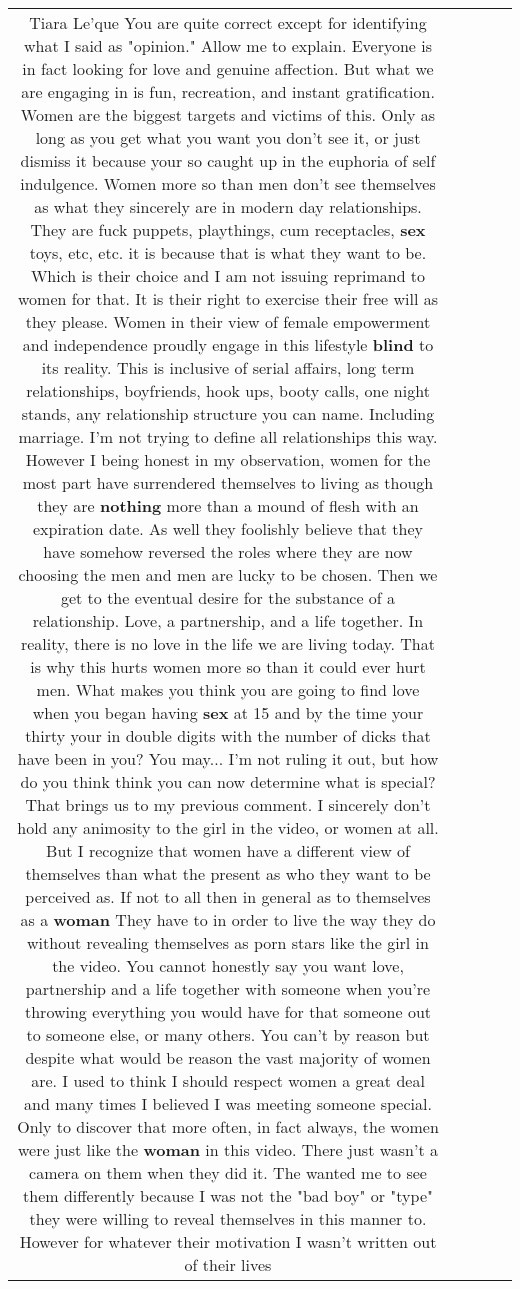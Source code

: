 \documentclass[11pt]{article}
\newlength\mylength
\begin{document}
\begin{center}
\begin{longtable}{|C{.65\mylength}|C{.30\mylength}|C{.12\mylength}|C{.12\mylength}|C{.12\mylength}|}
  \small Tiara Le'que  You are quite correct except for identifying  what I said as "opinion." Allow me to explain. Everyone is in fact looking for love and genuine affection.  But what we are engaging in is fun, recreation, and instant gratification. Women are the biggest targets and victims of this. Only as long as you get what you want you don't see it, or just dismiss it because your so caught up in the euphoria of self indulgence. Women more so than men don't see themselves as what they sincerely are in modern day relationships. They are fuck puppets, playthings, cum receptacles, \textbf{sex} toys, etc, etc. it is because that is what they want to be. Which is their choice and I am not issuing reprimand to women for that. It is their right to exercise their free will as they please.  Women in their view of female empowerment and independence proudly engage in this lifestyle  \textbf{blind} to its reality. This is inclusive of serial affairs, long term relationships, boyfriends, hook ups, booty calls, one night stands, any relationship structure you can name. Including marriage. I'm not trying to define all relationships this way. However I  being honest in my observation, women for the most part have surrendered themselves to living as though they are \textbf{nothing} more than a mound of flesh with an expiration date. As well they foolishly believe that they have somehow reversed the roles where they are now choosing the men and men are lucky to be chosen. Then we get to the eventual desire for the substance of a relationship.  Love, a partnership, and a life together. In reality, there is no love in the life we are living today. That is why this hurts women more so than it could ever hurt men. What makes you think you are going to find love when you began having \textbf{sex} at 15 and by the time your thirty your in double digits with the number of dicks that have been in you? You may... I'm not ruling it out, but how do you think think you can now determine what is special?That brings us to my previous comment.  I sincerely don't hold any animosity to the girl in the video, or women at all. But I recognize that women have a different view of themselves than what the present as who they want to be perceived as. If not to all then in general as to themselves as a \textbf{woman}  They have to in order to live the way they do without revealing themselves as porn stars like the girl in the video. You cannot honestly say you want love, partnership and a life together with someone when you're throwing everything you would have for that someone out to someone else, or many others. You can't by reason but despite what would be reason the vast majority of women are. I used to think  I should respect women a great deal and many times I believed I was meeting someone special. Only to discover that more often, in fact always, the women were just like the \textbf{woman} in this video. There just wasn't a camera on them when they did it. The wanted me to see them differently because I was not the "bad boy" or "type"  they were willing to reveal themselves in this manner to. However for whatever their motivation I wasn't written out of their lives 
\end{longtable}
\end{center}
\end{document}
